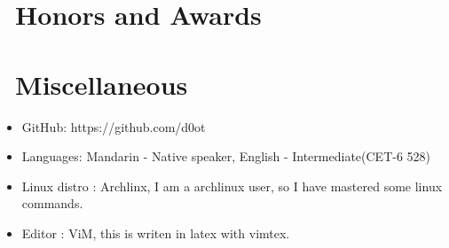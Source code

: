 \documentclass{resume}
\begin{document}
\section{\faHeartO\ Honors and Awards}

\section{\faInfo\ Miscellaneous}
\begin{itemize}[parsep=0.5ex]
  \item GitHub: https://github.com/d0ot
  \item Languages: Mandarin - Native speaker, English - Intermediate(CET-6 528)
  \item Linux distro : Archlinx, I am a archlinux user, so I have mastered some linux commands.
  \item Editor : ViM, this is writen in latex with vimtex.
\end{itemize}

%
%
\end{document}

